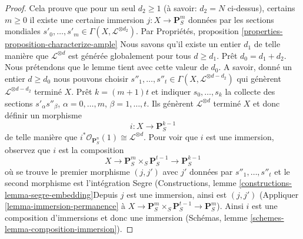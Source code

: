\begin{proof}
\medskip\noindent

Cela prouve que pour un seul $d_2 \geq 1$
(à savoir: $d_2 = N$ ci-dessus), certains $m \geq 0$ il existe une certaine immersion $j : X \to \mathbf{P}^m_S$ données par les sections mondiales
$s'_0, \ldots, s'_m \in \Gamma(X, \mathcal{L}^{\otimes d_2})$. Par Propriétés, proposition \ref{properties-proposition-characterize-ample}
Nous savons qu'il existe un entier
$d_1$ de telle manière que $\mathcal{L}^{\otimes d}$ est générée globalement pour tous $d \geq d_1$. Prêt $d_0 = d_1 + d_2$. Nous prétendons que le lemme tient avec cette valeur de $d_0$. A savoir, donné un entier $d \geq d_0$ nous pouvons choisir $s''_1, \ldots, s''_t
\in \Gamma(X, \mathcal{L}^{\otimes d - d_2})$ qui génèrent
$\mathcal{L}^{\otimes d - d_2}$ terminé $X$. Prêt $k = (m + 1)t$ et indiquer $s_0, \ldots, s_k$ la collecte des sections
$s'_\alpha s''_\beta$, $\alpha = 0, \ldots, m$,
$\beta = 1, \ldots, t$. Ils génèrent $\mathcal{L}^{\otimes d}$
terminé $X$ et donc définir un morphisme
$$
i : X \longrightarrow \mathbf{P}^{k - 1}_S
$$
de telle manière que $i^*\mathcal{O}_{\mathbf{P}^n_S}(1) \cong \mathcal{L}^{\otimes d}$. Pour voir que $i$ est une immersion, observez que $i$ est la composition
$$
X \longrightarrow \mathbf{P}^m_S \times_S \mathbf{P}^{t - 1}_S
\longrightarrow \mathbf{P}^{k - 1}_S
$$
où se trouve le premier morphisme $(j, j')$ avec $j'$ données par
$s''_1, \ldots, s''_t$ et le second morphisme est l'intégration Segre (Constructions, lemme \ref{constructions-lemma-segre-embedding}Depuis $j$ est une immersion, ainsi est $(j, j')$
(Appliquer \ref{lemma-immersion-permanence}
à $X \to \mathbf{P}^m_S \times_S \mathbf{P}^{t - 1}_S
\to \mathbf{P}^m_S$). Ainsi $i$ est une composition d'immersions et donc une immersion (Schémas, lemme \ref{schemes-lemma-composition-immersion}).

\end{proof}

